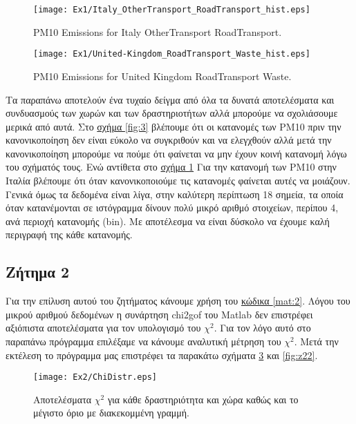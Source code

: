 \documentclass[11pt]{scrartcl} %
\begin{document}
\begin{figure}[H] 
	\label{fig:5}
	\centering
	\texttt{[image: Ex1/Italy\_OtherTransport\_RoadTransport\_hist.eps]}	
	\caption{PM10 Emissions for Italy OtherTransport RoadTransport.}
\end{figure}

\begin{figure}[H]
\label{fig:6} 
	\centering
	\texttt{[image: Ex1/United-Kingdom\_RoadTransport\_Waste\_hist.eps]}	
\caption{PM10 Emissions for United Kingdom RoadTransport Waste.}
\end{figure}


Τα παραπάνω αποτελούν ένα τυχαίο δείγμα από όλα τα δυνατά αποτελέσματα και συνδυασμούς των χωρών και των δραστηριοτήτων αλλά μπορούμε να σχολιάσουμε μερικά από αυτά. Στο \hyperref[fig:3]{σχήμα \ref*{fig:3}} βλέπουμε ότι οι κατανομές των PM10 πριν την κανονικοποίηση δεν είναι εύκολο να συγκριθούν και να ελεγχθούν αλλά μετά την κανονικοποίηση μπορούμε να πούμε ότι φαίνεται να μην έχουν κοινή κατανομή λόγω του σχήματός τους. Ενώ αντίθετα στο \hyperref[fig:5]{σχήμα \ref*{fig:5}} Για την κατανομή των PM10 στην Ιταλία βλέπουμε ότι όταν κανονικοποιούμε τις κατανομές φαίνεται αυτές να μοιάζουν. Γενικά όμως τα δεδομένα είναι λίγα, στην καλύτερη περίπτωση 18 σημεία, τα οποία όταν κατανέμονται σε ιστόγραμμα δίνουν πολύ μικρό αριθμό στοιχείων, περίπου 4, ανά περιοχή κατανομής (bin). Με αποτέλεσμα να είναι δύσκολο να έχουμε καλή περιγραφή της κάθε κατανομής. 

\subsection{Ζήτημα 2}
\label{subsec:z2}
Για την επίλυση αυτού του ζητήματος κάνουμε χρήση του \hyperref[mat:2]{κώδικα \ref*{mat:2}}. Λόγου του μικρού αριθμού δεδομένων η συνάρτηση chi2gof του Matlab δεν επιστρέφει αξιόπιστα αποτελέσματα για τον υπολογισμό του $\chi^{2}$. Για τον λόγο αυτό στο παραπάνω πρόγραμμα επιλέξαμε να κάνουμε αναλυτική μέτρηση του $\chi^{2}$. Μετά την εκτέλεση το πρόγραμμα μας επιστρέφει τα παρακάτω σχήματα \ref{fig:z21} και \ref{fig:z22}.



\begin{figure}[H]
\label{fig:z21} 
	\centering
	\texttt{[image: Ex2/ChiDistr.eps]}	
\caption{Αποτελέσματα $\chi^{2}$ για κάθε δραστηριότητα και χώρα καθώς και το μέγιστο όριο με διακεκομμένη γραμμή.}
\end{figure}
\end{document}
